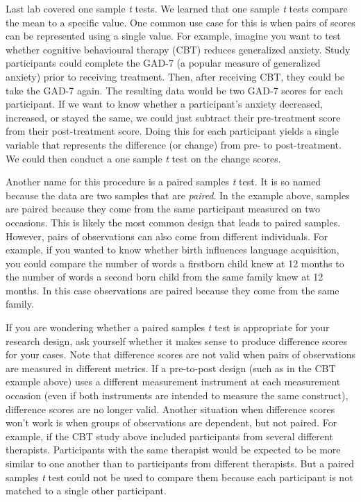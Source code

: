 \documentclass[
]{book}
\begin{document}
Last lab covered one sample \emph{t} tests. We learned that one sample \emph{t} tests compare the mean to a specific value. One common use case for this is when pairs of scores can be represented using a single value. For example, imagine you want to test whether cognitive behavioural therapy (CBT) reduces generalized anxiety. Study participants could complete the GAD-7 (a popular measure of generalized anxiety) prior to receiving treatment. Then, after receiving CBT, they could be take the GAD-7 again. The resulting data would be two GAD-7 scores for each participant. If we want to know whether a participant's anxiety decreased, increased, or stayed the same, we could just subtract their pre-treatment score from their post-treatment score. Doing this for each participant yields a single variable that represents the difference (or change) from pre- to post-treatment. We could then conduct a one sample \emph{t} test on the change scores.

Another name for this procedure is a paired samples \emph{t} test. It is so named because the data are two samples that are \emph{paired}. In the example above, samples are paired because they come from the same participant measured on two occasions. This is likely the most common design that leads to paired samples. However, pairs of observations can also come from different individuals. For example, if you wanted to know whether birth influences language acquisition, you could compare the number of words a firstborn child knew at 12 months to the number of words a second born child from the same family knew at 12 months. In this case observations are paired because they come from the same family.

If you are wondering whether a paired samples \emph{t} test is appropriate for your research design, ask yourself whether it makes sense to produce difference scores for your cases. Note that difference scores are not valid when pairs of observations are measured in different metrics. If a pre-to-post design (such as in the CBT example above) uses a different measurement instrument at each measurement occasion (even if both instruments are intended to measure the same construct), difference scores are no longer valid. Another situation when difference scores won't work is when groups of observations are dependent, but not paired. For example, if the CBT study above included participants from several different therapists. Participants with the same therapist would be expected to be more similar to one another than to participants from different therapists. But a paired samples \emph{t} test could not be used to compare them because each participant is not matched to a single other participant.
\end{document}
